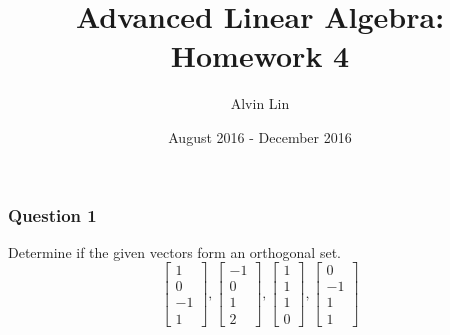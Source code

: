 \documentclass{math}
\title{Advanced Linear Algebra: Homework 4}
\author{Alvin Lin}
\date{August 2016 - December 2016}
\begin{document}
\maketitle

\subsubsection*{Question 1}
Determine if the given vectors form an orthogonal set.
\[ \begin{bmatrix}1 \\ 0 \\ -1 \\ 1\end{bmatrix},
  \begin{bmatrix}-1 \\ 0 \\ 1 \\ 2\end{bmatrix},
  \begin{bmatrix}1 \\ 1 \\ 1 \\ 0\end{bmatrix},
  \begin{bmatrix}0 \\ -1 \\ 1 \\ 1\end{bmatrix} \]
\end{document}
